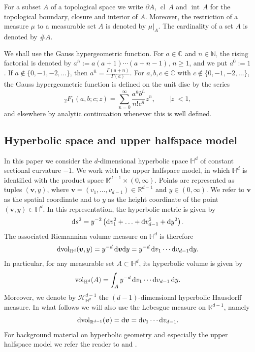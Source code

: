 \documentclass[11pt,a4paper]{article}
\theoremstyle{plain}
\theoremstyle{definition}
\theoremstyle{remark}
\newcommand{\dint}{\textup{d}}
\newcommand{\vol}{\mathop{\mathrm{vol}}\nolimits}
\newcommand{\bv}{\boldsymbol{v}}
\def\CC{\mathbb{C}}
\def\HH{\mathbb{H}}
\def\NN{\mathbb{N}}
\def\RR{\mathbb{R}}
\def\cH{\mathcal{H}}
\begin{document}
For a subset $A$ of a topological space we write $\partial A$, $\operatorname{cl}\,A$ and $\operatorname{int}\,A$ for the topological boundary, closure and interior of $A$. Moreover, the restriction of a measure $\mu$ to a measurable set $A$ is denoted by $\mu|_A$. The cardinality of a set $A$ is denoted by $\#A$.

We shall use the Gauss hypergeometric function. For $a\in\CC$ and
$n\in\NN$, the rising factorial is denoted by $a^{\overline{n}}:=a(a+1)\cdots(a+n-1)$, $n\geq 1$,
and we put $a^{\overline{0}}:=1$. If $a\notin\{0,-1,-2,\ldots\}$, then $a^{\overline{n}}=\frac{\Gamma(a+n)}{\Gamma(a)}$.
For $a,b,c\in\CC$ with $c\notin\{0,-1,-2,\ldots\}$, the Gauss
hypergeometric function is defined on the unit disc by the series
\[
	{}_2F_1(a,b;c;z)
	=
	\sum_{n=0}^{\infty}
	\frac{a^{\overline{n}}b^{\overline{n}}}{n!c^{\overline{n}}}z^n,
	\qquad |z|<1,
\]
and elsewhere by analytic continuation whenever this is well defined.

\subsection{Hyperbolic space and upper halfspace model}

In this paper we consider the $d$-dimensional hyperbolic space $\HH^d$ of constant sectional curvature $-1$. We work with the upper halfspace model, in which $\HH^d$ is identified with the product space $\RR^{d-1}\times(0,\infty)$. Points are represented as tuples $(\bv,y)$, where $\bv=(v_1,\ldots,v_{d-1})\in\RR^{d-1}$ and $y\in(0,\infty)$. We refer to $\bv$ as the spatial coordinate and to $y$ as the height coordinate of the point $(\bv,y)\in\HH^d$.   In this representation, the hyperbolic metric is given by
\begin{equation}\label{eq:HyperbolicMetric}
	\dint s^2 = y^{-2}\left(\dint v_1^2+\ldots+\dint v_{d-1}^2+\dint y^2\right).
\end{equation}
The associated Riemannian volume measure on $\HH^d$ is therefore
\[
	\dint\!\vol_{\HH^d}(\bv,y)
	= y^{-d}\,\dint\bv\dint y = y^{-d} \,\dint v_1\cdots\dint v_{d-1}\dint y.
\]
In particular, for any measurable set $A\subset\HH^d$, its hyperbolic volume is given by
\begin{equation}\label{eq:HyperbolicVolume}
	\vol_{\HH^d}(A)
	= \int_A y^{-d}\,\dint v_1\cdots\dint v_{d-1}\,\dint y.
\end{equation}
Moreover, we denote by $\cH^{d-1}_{\HH^d}$ the $(d-1)$-dimensional hyperbolic Hausdorff measure.
In what follows we will also use the Lebesgue measure on $\RR^{d-1}$, namely
\[
	\dint\!\vol_{\RR^{d-1}}(\bv) = \dint\bv
	= \dint v_1\cdots\dint v_{d-1}.
\]
For background material on hyperbolic geometry and especially the upper halfspace model we refer the reader to \cite{BenedettiPetronio,Ratcliffe} and \cite[Chapter 36]{Voight}.
\end{document}
